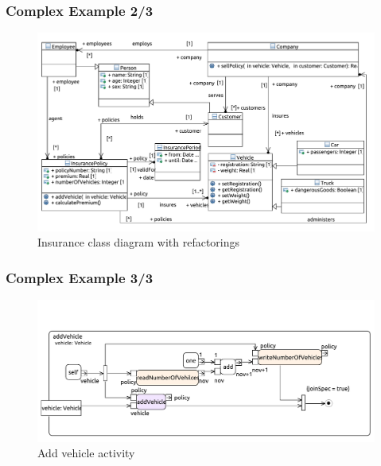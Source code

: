 \documentclass{beamer}
\begin{document}
        
\begin{frame}
\frametitle{Complex Example 2/3}
\begin{figure}[h!t]
 \centering
 \includegraphics[scale=0.4]{images/insurance_ref/Model_Model_ClassDiagram}
 \caption{Insurance class diagram with refactorings}
 \label{fig:classdiagramcomplex}
\end{figure}
\end{frame}

\begin{frame}
\frametitle{Complex Example 3/3}
\begin{figure}[h!t]
 \centering
 \includegraphics[scale=0.45]{images/insurance_ref/Activity_addVehicle_addVehicle}
 \caption{Add vehicle activity}
 \label{fig:calculatePremium}
\end{figure}
\end{frame}
\end{document}
